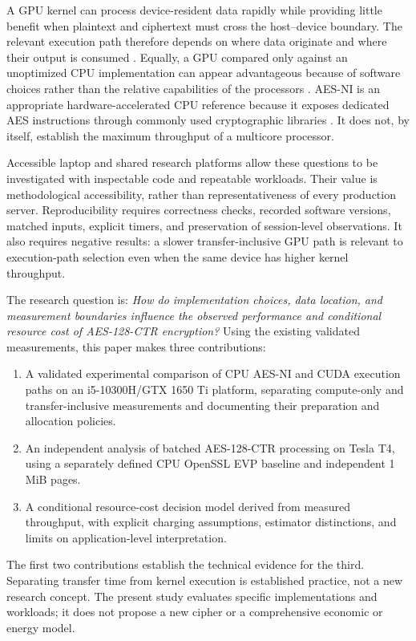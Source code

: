 \documentclass[11pt,a4paper]{article}
\begin{document}
A GPU kernel can process device-resident data rapidly while providing little benefit when plaintext and ciphertext must cross the host--device boundary. The relevant execution path therefore depends on where data originate and where their output is consumed \citep{gregg2011}. Equally, a GPU compared only against an unoptimized CPU implementation can appear advantageous because of software choices rather than the relative capabilities of the processors \citep{lee2010}. AES-NI is an appropriate hardware-accelerated CPU reference because it exposes dedicated AES instructions through commonly used cryptographic libraries \citep{intel_aesni}. It does not, by itself, establish the maximum throughput of a multicore processor.

Accessible laptop and shared research platforms allow these questions to be investigated with inspectable code and repeatable workloads. Their value is methodological accessibility, rather than representativeness of every production server. Reproducibility requires correctness checks, recorded software versions, matched inputs, explicit timers, and preservation of session-level observations. It also requires negative results: a slower transfer-inclusive GPU path is relevant to execution-path selection even when the same device has higher kernel throughput.

The research question is: \emph{How do implementation choices, data location, and measurement boundaries influence the observed performance and conditional resource cost of AES-128-CTR encryption?} Using the existing validated measurements, this paper makes three contributions:
\begin{enumerate}
\item A validated experimental comparison of CPU AES-NI and CUDA execution paths on an i5-10300H/GTX 1650 Ti platform, separating compute-only and transfer-inclusive measurements and documenting their preparation and allocation policies.
\item An independent analysis of batched AES-128-CTR processing on Tesla T4, using a separately defined CPU OpenSSL EVP baseline and independent 1 MiB pages.
\item A conditional resource-cost decision model derived from measured throughput, with explicit charging assumptions, estimator distinctions, and limits on application-level interpretation.
\end{enumerate}
The first two contributions establish the technical evidence for the third. Separating transfer time from kernel execution is established practice, not a new research concept. The present study evaluates specific implementations and workloads; it does not propose a new cipher or a comprehensive economic or energy model.
\end{document}
